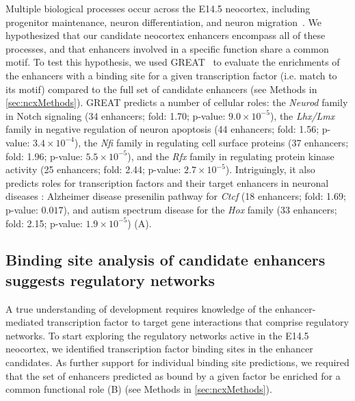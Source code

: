 Multiple biological processes occur across the E14.5 neocortex, including progenitor maintenance, neuron differentiation, and neuron
migration~\citep{Molyneaux2007}.  We hypothesized that our candidate neocortex enhancers encompass all of these processes, and that
enhancers involved in a specific function share a common motif.  To test this hypothesis, we used GREAT~\citep{McLean2010} to evaluate
the enrichments of the enhancers with a binding site for a given transcription factor (i.e. match to its motif) compared to the full set
of candidate enhancers (see Methods in \ref{sec:ncxMethods}).  GREAT predicts a number of cellular roles: the \textit{Neurod} family in Notch signaling (34 enhancers;
fold: 1.70; p-value: $9.0\times10^{-5}$), the \textit{Lhx/Lmx} family in negative regulation of neuron apoptosis
(44 enhancers; fold: 1.56; p-value: $3.4\times10^{-4}$), the \textit{Nfi} family in regulating cell surface proteins
(37 enhancers; fold: 1.96; p-value: $5.5\times10^{-5}$), and the \textit{Rfx} family in regulating protein kinase activity
(25 enhancers; fold: 2.44; p-value: $2.7\times10^{-5}$).  Intriguingly, it also predicts roles for transcription factors
and their target enhancers in neuronal diseases : Alzheimer disease presenilin pathway for \textit{Ctcf} (18 enhancers; fold: 1.69; p-value: $0.017$),
and autism spectrum disease for the \textit{Hox} family (33 enhancers; fold: 2.15; p-value: $1.9\times10^{-5}$) (A).

\subsection{Binding site analysis of candidate enhancers suggests regulatory networks}
\label{sec:ncxNetworks}
A true understanding of development requires knowledge of the enhancer-mediated transcription factor to target gene interactions that
comprise regulatory networks.  To start exploring the regulatory networks active in the E14.5 neocortex, we identified transcription
factor binding sites in the enhancer candidates.  As further support for individual binding site predictions, we required that the set
of enhancers predicted as bound by a given factor be enriched for a common functional role (B) (see Methods in \ref{sec:ncxMethods}).

